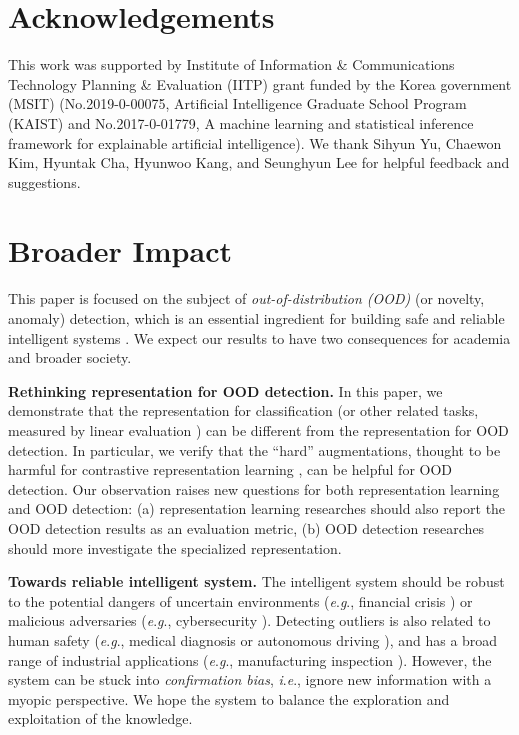 \documentclass{article}
\newcommand{\ie}{\textit{i}.\textit{e}.}
\newcommand{\eg}{\textit{e}.\textit{g}.}
\begin{document}
 
\section*{Acknowledgements}
This work was supported by Institute of Information \& Communications Technology Planning \& Evaluation (IITP) grant funded by the Korea government (MSIT) (No.2019-0-00075, Artificial Intelligence Graduate School Program (KAIST) and No.2017-0-01779, A machine learning and statistical inference framework for explainable artificial intelligence). We thank Sihyun Yu, Chaewon Kim, Hyuntak Cha, Hyunwoo Kang, and Seunghyun Lee for helpful feedback and suggestions.

\section*{Broader Impact}

This paper is focused on the subject of \textit{out-of-distribution (OOD)} (or novelty, anomaly) detection, which is an essential ingredient for building safe and reliable intelligent systems \citep{amodei2016concrete}. We expect our results to have two consequences for academia and broader society.


\textbf{Rethinking representation for OOD detection.}
In this paper, we demonstrate that the representation for classification (or other related tasks, measured by linear evaluation \citep{kolesnikov2019revisiting}) can be different from the representation for OOD detection. In particular, we verify that the ``hard'' augmentations, thought to be harmful for contrastive representation learning \citep{chen2020simple}, can be helpful for OOD detection. Our observation raises new questions for both representation learning and OOD detection: (a) representation learning researches should also report the OOD detection results as an evaluation metric, (b) OOD detection researches should more investigate the specialized representation.


\textbf{Towards reliable intelligent system.}
The intelligent system should be robust to the potential dangers of uncertain environments (\eg, financial crisis \citep{taylor2009black}) or malicious adversaries (\eg, cybersecurity \citep{kruegel2003anomaly}). Detecting outliers is also related to human safety (\eg, medical diagnosis \citep{caruana2015intelligible} or autonomous driving \citep{eykholt2018robust}), and has a broad range of industrial applications (\eg, manufacturing inspection \citep{lucke2008smart}). However, the system can be stuck into \textit{confirmation bias}, \ie, ignore new information with a myopic perspective. We hope the system to balance the exploration and exploitation of the knowledge.
\end{document}
